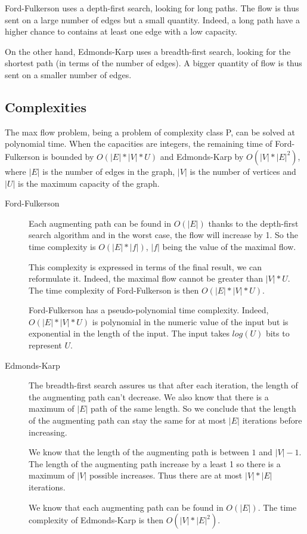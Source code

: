 Ford-Fulkerson uses a depth-first search, looking for long paths. The flow is thus sent on a large number of edges but a small quantity. Indeed, a long path have a higher chance to contains at least one edge with a low capacity. \newline

On the other hand, Edmonds-Karp uses a breadth-first search, looking for the shortest path (in terms of the number of edges). A bigger quantity of flow is thus sent on a smaller number of edges. \newline


\subsection{Complexities}
The max flow problem, being a problem of complexity class P, can be solved at polynomial time. When the capacities are integers, the remaining time of Ford-Fulkerson is bounded by $O(|E|*|V|*U)$ and Edmonds-Karp by $O(|V|*|E|^2)$, where $|E|$ is the number of edges in the graph, $|V|$ is the number of vertices and $|U|$ is the maximum capacity of the graph.

\begin{description}
\item[Ford-Fulkerson]{Each augmenting path can be found in $O(|E|)$ thanks to the depth-first search algorithm and in the worst case, the flow will increase by 1. So the time complexity is $O(|E|*|f|)$, $|f|$ being the value of the maximal flow. 

This complexity is expressed in terms of the final result, we can reformulate it. Indeed, the maximal flow cannot be greater than $|V|*U$. The time complexity of Ford-Fulkerson is then $O(|E|*|V|*U)$.

Ford-Fulkerson has a pseudo-polynomial time complexity. Indeed, $O(|E|*|V|*U)$ is polynomial in the numeric value of the input but is exponential in the length of the input. The input takes $log(U)$ bits to represent $U$.}

\item[Edmonds-Karp]{The breadth-first search assures us that after each iteration, the length of the augmenting path can't decrease. We also know that there is a maximum of $|E|$ path of the same length. So we conclude that the length of the augmenting path can stay the same for at most $|E|$ iterations before increasing. 

We know that the length of the augmenting path is between $1$ and $|V|-1$. The length of the augmenting path increase by a least 1 so there is a maximum of $|V|$ possible increases. Thus there are at most $|V|*|E|$ iterations.

We know that each augmenting path can be found in $O(|E|)$. The time complexity of Edmonds-Karp is then $O(|V|*|E|^2)$.}
\end{description}



